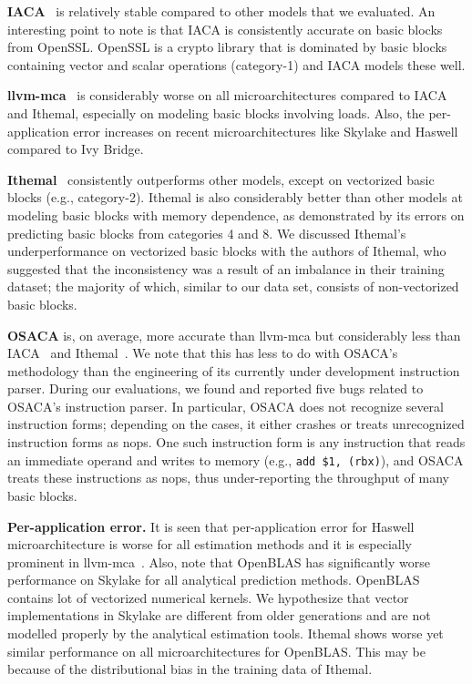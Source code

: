  
 \textbf{IACA}~\cite{iaca} is relatively stable compared to other models that we evaluated.
An interesting point to note is that IACA is consistently accurate on basic blocks from OpenSSL. 
OpenSSL is a crypto library that is dominated by basic blocks containing vector and scalar operations
(category-1) and IACA models these well. 

    \textbf{llvm-mca}~\cite{llvm-mca} is considerably worse on all microarchitectures compared to IACA and Ithemal,
especially on modeling basic blocks involving loads. Also, the per-application error increases on recent microarchitectures like Skylake and Haswell compared to Ivy Bridge.

\textbf{Ithemal}~\cite{ithemal} consistently outperforms other models, except on vectorized basic blocks (e.g., category-2).
Ithemal is also considerably better than other models at modeling basic blocks with memory dependence,
as demonstrated by its errors on predicting basic blocks from categories 4 and 8.
We discussed Ithemal's underperformance on vectorized basic blocks with the authors of Ithemal, who suggested that the inconsistency
was a result of an imbalance in their training dataset;
the majority of which, similar to our data set, consists of non-vectorized basic blocks.

\textbf{OSACA}\cite{osaca} is, on average, more accurate than llvm-mca but
considerably less than IACA~\cite{iaca} and Ithemal~\cite{ithemal}.
We note that this has less to do with OSACA's methodology than the engineering of its currently under development instruction parser.
During our evaluations, we found and reported five bugs related to OSACA's instruction parser.
In particular, OSACA does not recognize several instruction forms;
depending on the cases, it either crashes or treats unrecognized instruction forms as nops.
One such instruction form is any instruction that reads an immediate operand and writes to memory
(e.g., \verb|add $1, (rbx)|), and OSACA treats these instructions as nops, thus under-reporting the throughput of
many basic blocks.

\textbf{Per-application error.} It is seen that per-application error for Haswell microarchitecture is worse for all estimation methods and it is especially prominent in llvm-mca~\cite{llvm-mca}. Also, note that OpenBLAS has significantly worse performance on Skylake for all analytical prediction methods. OpenBLAS contains lot of vectorized numerical kernels. We hypothesize that vector implementations in Skylake are different from older generations and are not modelled properly by the analytical estimation tools. Ithemal shows worse yet  similar performance on all microarchitectures for OpenBLAS. This may be because of the distributional bias in the training data of Ithemal.

